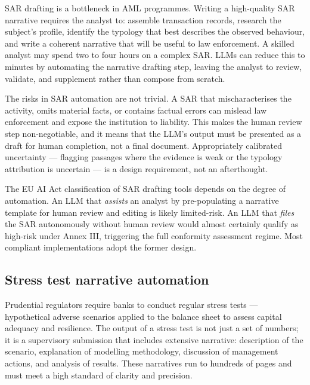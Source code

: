 SAR drafting is a bottleneck in AML programmes. Writing a high-quality SAR narrative requires the analyst to: assemble transaction records, research the subject's profile, identify the typology that best describes the observed behaviour, and write a coherent narrative that will be useful to law enforcement. A skilled analyst may spend two to four hours on a complex SAR. LLMs can reduce this to minutes by automating the narrative drafting step, leaving the analyst to review, validate, and supplement rather than compose from scratch.

The risks in SAR automation are not trivial. A SAR that mischaracterises the activity, omits material facts, or contains factual errors can mislead law enforcement and expose the institution to liability. This makes the human review step non-negotiable, and it means that the LLM's output must be presented as a draft for human completion, not a final document. Appropriately calibrated uncertainty --- flagging passages where the evidence is weak or the typology attribution is uncertain --- is a design requirement, not an afterthought.

\begin{remark}
The EU AI Act classification of SAR drafting tools depends on the degree of automation. An LLM that \emph{assists} an analyst by pre-populating a narrative template for human review and editing is likely limited-risk. An LLM that \emph{files} the SAR autonomously without human review would almost certainly qualify as high-risk under Annex III, triggering the full conformity assessment regime. Most compliant implementations adopt the former design.
\end{remark}

\subsection{Stress test narrative automation}
\label{sec:ch11-stress-test-narrative}

Prudential regulators require banks to conduct regular stress tests --- hypothetical adverse scenarios applied to the balance sheet to assess capital adequacy and resilience. The output of a stress test is not just a set of numbers; it is a supervisory submission that includes extensive narrative: description of the scenario, explanation of modelling methodology, discussion of management actions, and analysis of results. These narratives run to hundreds of pages and must meet a high standard of clarity and precision.

